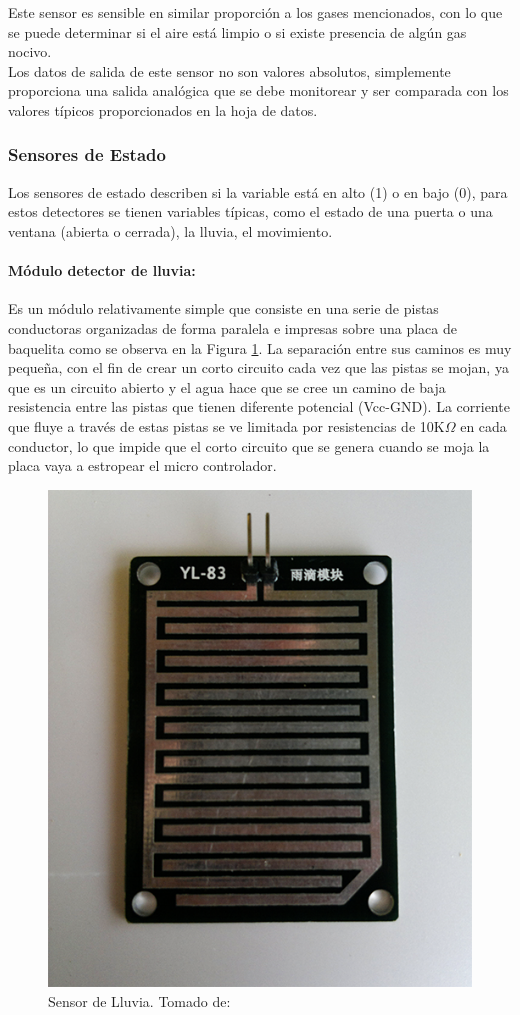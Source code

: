 Este sensor es sensible en similar proporción a los gases mencionados, con lo que se puede determinar si el aire está limpio o si existe presencia de algún gas nocivo.\\

Los datos de salida de este sensor no son valores absolutos, simplemente proporciona una salida analógica que se debe monitorear y ser comparada con los valores típicos proporcionados en la hoja de datos.\cite{MQ2}

\subsubsection{Sensores de Estado}

Los sensores de estado describen si la variable está en alto (1) o en bajo (0), para estos detectores se tienen variables típicas, como el estado de una puerta o una ventana (abierta o cerrada), la lluvia, el movimiento.

\paragraph{Módulo detector de lluvia: }

Es un módulo relativamente simple que consiste en una serie de pistas conductoras organizadas de forma paralela e impresas sobre una placa de baquelita como se observa en la Figura \ref{fig:yl-83}. La separación entre sus caminos es muy pequeña, con el fin de crear un corto circuito cada vez que las pistas se mojan, ya que es un circuito abierto y el agua hace que se cree un camino de baja resistencia entre las pistas que tienen diferente potencial (Vcc-GND). La corriente que fluye a través de estas pistas se ve limitada por resistencias de 10K$\Omega$ en cada conductor, lo que impide que el corto circuito que se genera cuando se moja la placa vaya a estropear el micro controlador.\cite{LLU}

\begin{figure}[H]
	\centering
	\caption[Sensor de Lluvia.]{Sensor de Lluvia. Tomado de: \cite{LLU}}
	\label{fig:yl-83}
	\includegraphics[width=0.35\linewidth]{Imagenes/YL-83}
\end{figure}

